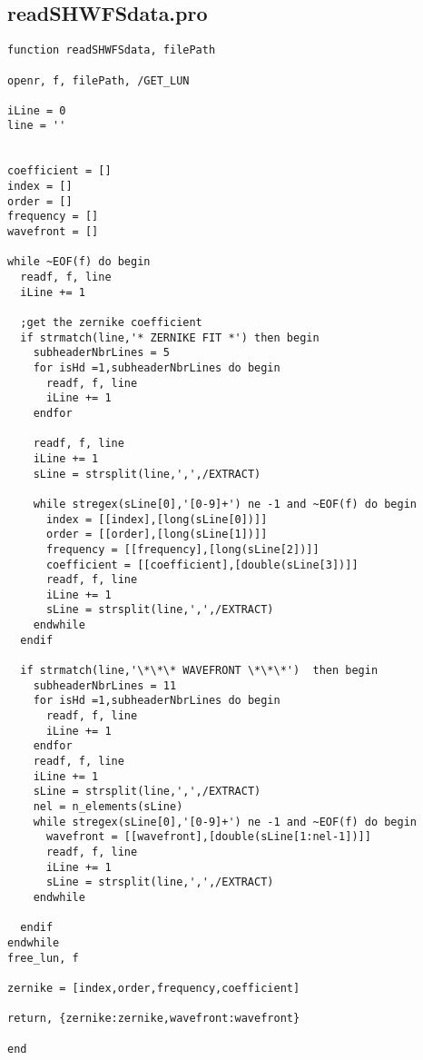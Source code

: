 \subsection{readSHWFSdata.pro}
\label{subapp:readSHWFSdata}

\begin{lstlisting}
function readSHWFSdata, filePath

openr, f, filePath, /GET_LUN

iLine = 0
line = ''


coefficient = []
index = []
order = []
frequency = []
wavefront = []

while ~EOF(f) do begin
  readf, f, line
  iLine += 1
  
  ;get the zernike coefficient
  if strmatch(line,'* ZERNIKE FIT *') then begin
    subheaderNbrLines = 5
    for isHd =1,subheaderNbrLines do begin
      readf, f, line
      iLine += 1
    endfor
    
    readf, f, line
    iLine += 1
    sLine = strsplit(line,',',/EXTRACT)
    
    while stregex(sLine[0],'[0-9]+') ne -1 and ~EOF(f) do begin
      index = [[index],[long(sLine[0])]]
      order = [[order],[long(sLine[1])]]
      frequency = [[frequency],[long(sLine[2])]]
      coefficient = [[coefficient],[double(sLine[3])]]
      readf, f, line
      iLine += 1
      sLine = strsplit(line,',',/EXTRACT)
    endwhile
  endif
  
  if strmatch(line,'\*\*\* WAVEFRONT \*\*\*')  then begin
    subheaderNbrLines = 11
    for isHd =1,subheaderNbrLines do begin
      readf, f, line
      iLine += 1
    endfor
    readf, f, line
    iLine += 1
    sLine = strsplit(line,',',/EXTRACT)
    nel = n_elements(sLine)
    while stregex(sLine[0],'[0-9]+') ne -1 and ~EOF(f) do begin
      wavefront = [[wavefront],[double(sLine[1:nel-1])]]
      readf, f, line
      iLine += 1
      sLine = strsplit(line,',',/EXTRACT)
    endwhile
    
  endif
endwhile
free_lun, f

zernike = [index,order,frequency,coefficient]

return, {zernike:zernike,wavefront:wavefront}

end
\end{lstlisting}